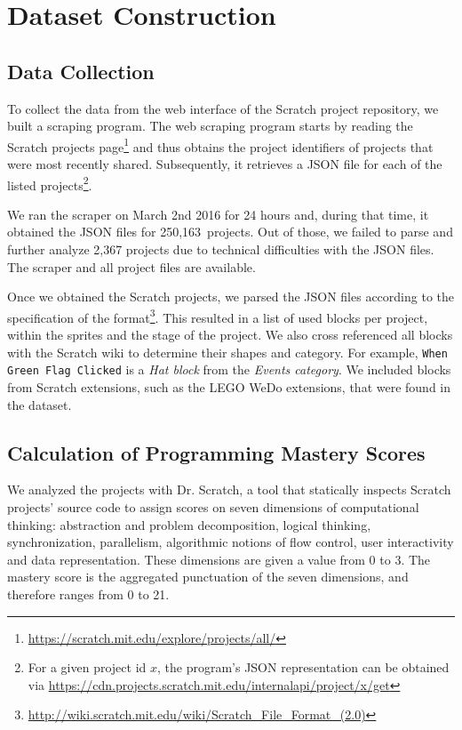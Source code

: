 \documentclass[10pt, conference]{IEEEtran}
\newcommand{\nPrograms}{250,163}
\newcommand{\fenia}[1]{\emph{\color{blue}Fenia says: #1}}
\begin{document}
\section{Dataset Construction}
\label{dataset}

\subsection{Data Collection}
To collect the data from the web interface of the Scratch project repository, we built a scraping program.
The web scraping program starts by reading the Scratch projects page\footnote{\label{scratchpublic}\url{https://scratch.mit.edu/explore/projects/all/}} and thus obtains the project identifiers of projects that were most recently shared.
Subsequently, it retrieves a JSON file for each of the listed projects\footnote{For a given project id $x$, the program's JSON representation can be obtained via \url{https://cdn.projects.scratch.mit.edu/internalapi/project/x/get}}.

We ran the scraper on March 2nd 2016 for 24 hours and, during that time, it obtained the JSON files for \nPrograms~projects. Out of those, we failed to parse and further analyze 2,367 projects due to technical difficulties with the JSON files.
The scraper and all project files are available\footnotemark[\ref{dataseturl}].

Once we obtained the Scratch projects, we parsed the JSON files according to the specification of the format\footnote{\url{http://wiki.scratch.mit.edu/wiki/Scratch_File_Format_(2.0)}}.
This resulted in a list of used blocks per project, within the sprites and the stage of the project.
We also cross referenced all blocks with the Scratch wiki to determine their shapes and category.
For example, \texttt{When Green Flag Clicked} is a \emph{Hat block} from the \emph{Events category}.
We included blocks from Scratch extensions, such as the LEGO WeDo extensions, that were found in the dataset.

\subsection{Calculation of Programming Mastery Scores}
We analyzed the projects with Dr. Scratch, a tool that statically inspects Scratch projects' source code to assign scores on seven dimensions of computational thinking: abstraction and problem decomposition, logical thinking, synchronization, parallelism, algorithmic notions of flow control, user interactivity and data representation. These dimensions are given a value from 0 to 3. The mastery score is the aggregated punctuation of the seven dimensions, and therefore ranges from 0 to 21.
\end{document}
